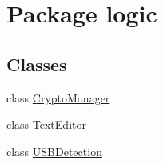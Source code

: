 \hypertarget{namespacelogic}{}\section{Package logic}
\label{namespacelogic}
\subsection*{Classes}
\begin{DoxyCompactItemize}
\item 
class \mbox{\hyperlink{classlogic_1_1_crypto_manager}{Crypto\+Manager}}
\item 
class \mbox{\hyperlink{classlogic_1_1_text_editor}{Text\+Editor}}
\item 
class \mbox{\hyperlink{classlogic_1_1_u_s_b_detection}{U\+S\+B\+Detection}}
\end{DoxyCompactItemize}
